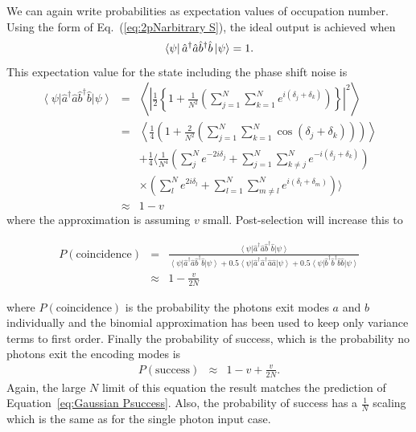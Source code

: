 \documentclass[aps,pra,twocolumn,superscriptaddress,numerical,floatfix]{revtex4-1}
\begin{document}
We can again write probabilities as expectation values of occupation number.  Using the form of Eq.~(\ref{eq:2pNarbitrary S}), the ideal output is achieved when
\begin{equation}
\bra{\psi}\hat{a}^{\dagger}\hat{a}\hat{b}^{\dagger}\hat{b}\ket{\psi} = 1.
\end{equation}
This expectation value for the state including the phase shift noise is
\begin{eqnarray}
\left\langle \psi\right|\hat{a}^{\dagger}\hat{a}\hat{b}^{\dagger}\hat{b}\left|\psi\right\rangle & = & \left\langle \left|\frac{1}{2}\left\{ 1+\frac{1}{N^{2}}\left(\sum_{j=1}^{N}\sum_{k=1}^{N}e^{i(\delta_{j}+\delta_{k})}\right)\right\} \right|^{2}\right\rangle \nonumber \\
& = & \left\langle \frac{1}{4}\left(1+\frac{2}{N^{2}}\left(\sum_{j=1}^{N}\sum_{k=1}^{N}\cos\left(\delta_{j}+\delta_{k}\right)\right)\right)\right\rangle \nonumber \\
&  & +\frac{1}{4}\Biggl\langle\frac{1}{N^{4}}\left(\sum_{j}^{N}e^{-2i\delta_{j}}+\sum_{j=1}^{N}\sum_{k\ne j}^{N}e^{-i(\delta_{j}+\delta_{k})}\right)\nonumber \\
&  & \times\left(\sum_{l}^{N}e^{2i\delta_{l}}+\sum_{l=1}^{N}\sum_{m\ne l}^{N}e^{i(\delta_{l}+\delta_{m})}\right)\Biggr\rangle\nonumber \\
& \approx & 1-v\label{eq:exp. value aabb}
\end{eqnarray}
where the approximation is assuming $v$ small.  Post-selection will increase this to 
\begin{widetext}
\begin{eqnarray}
P(\textrm{coincidence}) & = & \frac{\left\langle \psi\right|\hat{a}^{\dagger}\hat{a}\hat{b}^{\dagger}\hat{b}\left|\psi\right\rangle }{\left\langle \psi\right|\hat{a}^{\dagger}\hat{a}\hat{b}^{\dagger}\hat{b}\left|\psi\right\rangle +0.5\left\langle \psi\right|\hat{a}^{\dagger}\hat{a}^{\dagger}\hat{a}\hat{a}\left|\psi\right\rangle +0.5\left\langle \psi\right|\hat{b}^{\dagger}\hat{b}^{\dagger}\hat{b}\hat{b}\left|\psi\right\rangle }\nonumber \\
& \approx & 1-\frac{v}{2N}\label{eq:2pNarb PS}
\end{eqnarray}
\end{widetext}
where $P(\textrm{coincidence})$ is the probability the photons exit modes $a$ and $b$ individually and the binomial approximation has been used to keep only variance terms to first order.  Finally the probability of success, which is the probability no photons exit the encoding modes is 
\begin{eqnarray}
	P(\textrm{success}) & \approx & 1-v+\frac{v}{2N}.\label{eq:2pNarb Success}
\end{eqnarray}
Again, the large $N$ limit of this equation the result matches the prediction of Equation~\ref{eq:Gaussian Psuccess}. Also, the probability of success has a $\frac{1}{N}$ scaling which is the same as for the single photon input case. 
\end{document}
